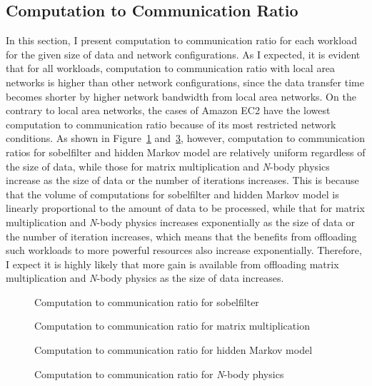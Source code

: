 \subsection{Computation to Communication Ratio}
\label{character:ctoc}
%
In this section, I present computation to communication ratio 
for each workload for the given size of data and network configurations.
%
As I expected, it is evident that for all workloads, computation to communication
ratio with local area networks is higher than other network
configurations, since the data transfer time becomes shorter by higher
network bandwidth from local area networks.
%
On the contrary to local area networks, the cases of Amazon EC2 have the
lowest computation to communication ratio because of its most restricted
network conditions.
%
As shown in Figure~\ref{fig:ctoc_sobelfilter} and~\ref{fig:ctoc_hmm}, however, 
computation to communication ratios 
for sobelfilter and hidden Markov model are relatively uniform
regardless of the size of data, while those for matrix multiplication
and {\it N}-body physics increase as the size of data or the
number of iterations increases. 
%
This is because that the volume of computations for sobelfilter and
hidden Markov model is linearly proportional to the amount of data to be
processed, while that for matrix multiplication and
{\it N}-body physics increases exponentially as the size of data or
the number of iteration increases, which means that the benefits from
offloading such workloads to more powerful resources also increase exponentially.
%
Therefore, I expect it is highly likely that more gain is available
from offloading matrix multiplication and \textit{N}-body physics 
as the size of data increases. 
%
\begin{figure}
\centering
{}
\caption{Computation to communication ratio for sobelfilter}
\label{fig:ctoc_sobelfilter}
\end{figure}
%
\begin{figure}
\centering
{}
\caption{Computation to communication ratio for matrix multiplication}
\label{fig:ctoc_matrix}
\end{figure}
%
\begin{figure}
\centering
{}
\caption{Computation to communication ratio for hidden Markov model}
\label{fig:ctoc_hmm}
\end{figure}
%
\begin{figure}
\centering
{}
\caption{Computation to communication ratio for {\it N}-body physics}
\label{fig:ctoc_nbody}
\end{figure}
%
